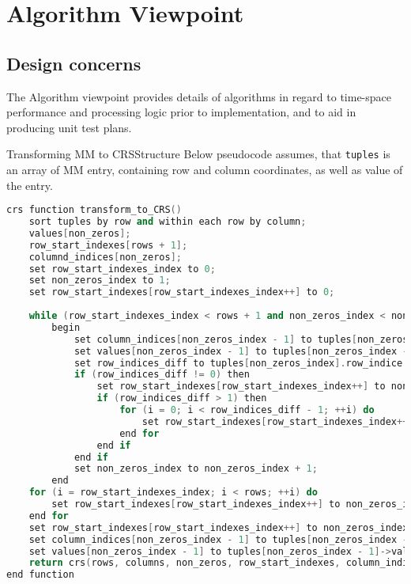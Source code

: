\chapter{Algorithm Viewpoint}
\label{ch:algorithm-viewpoint}
\begin{comment}
	The detailed design description of operations (such as methods and functions), the internal details and logic of each design entity.
\end{comment}
	
	\section{Design concerns}
	\label{sec:algorithm-viewpoint:design-concerns}
	The Algorithm viewpoint provides details of algorithms in regard to time-space performance and processing logic prior to implementation, and to aid in producing unit test plans.
	\begin{comment}
		The Algorithm viewpoint provides details needed by programmers, analysts of algorithms in regard to	time-space performance and processing logic prior to implementation, and to aid in producing unit test plans.
	\end{comment}
	
	\begin{concerns}{Transforming \gls{MM} to \gls{CRS}}{Structure}
		Below pseudocode assumes, that \texttt{tuples} is an array of \gls{MM} entry, containing row and column coordinates, as well as value of the entry. 
		\begin{lstlisting}[language=C++,caption={Pseudocode of transforming algorithm from \gls{MM} to \gls{CRS} format.}]
crs function transform_to_CRS()
	sort tuples by row and within each row by column;
	values[non_zeros];
	row_start_indexes[rows + 1];
	columnd_indices[non_zeros];
	set row_start_indexes_index to 0;
	set non_zeros_index to 1;
	set row_start_indexes[row_start_indexes_index++] to 0;
	
	while (row_start_indexes_index < rows + 1 and non_zeros_index < non_zeros) do
		begin
			set column_indices[non_zeros_index - 1] to tuples[non_zeros_index - 1]->column_indice;
			set values[non_zeros_index - 1] to tuples[non_zeros_index - 1]->value;
			set row_indices_diff to tuples[non_zeros_index].row_indice - tuples[non_zeros_index - 1].row_indice;
			if (row_indices_diff != 0) then
				set row_start_indexes[row_start_indexes_index++] to non_zeros_index;
				if (row_indices_diff > 1) then
					for (i = 0; i < row_indices_diff - 1; ++i) do
						set row_start_indexes[row_start_indexes_index++] to non_zeros_index;
					end for
				end if
			end if
			set non_zeros_index to non_zeros_index + 1;
		end
	for (i = row_start_indexes_index; i < rows; ++i) do 
		set row_start_indexes[row_start_indexes_index++] to non_zeros_index;
	end for
	set row_start_indexes[row_start_indexes_index++] to non_zeros_index;
	set column_indices[non_zeros_index - 1] to tuples[non_zeros_index - 1]->column_indice;
	set values[non_zeros_index - 1] to tuples[non_zeros_index - 1]->value;
	return crs(rows, columns, non_zeros, row_start_indexes, column_indices, values);
end function
		\end{lstlisting}
	\end{concerns}

